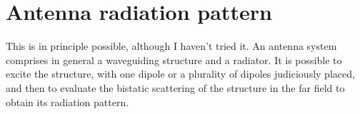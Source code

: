 \documentclass[a4paper,10pt]{book}
\begin{document}
\section{Antenna radiation pattern}
%
\par
This is in principle possible, although I haven't tried it. An antenna system comprises in general a waveguiding structure and a radiator. It is possible to excite the structure, with one dipole or a plurality of dipoles judiciously placed, and then to evaluate the bistatic scattering of the structure in the far field to obtain its radiation pattern.
\end{document}
